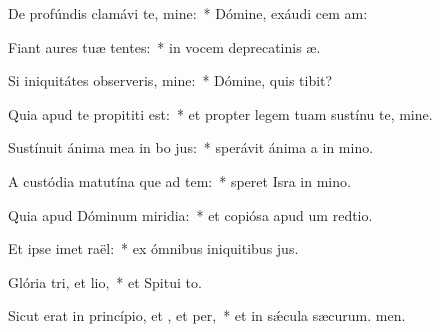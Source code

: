 \item De profúndis clamávi  te, mine:~* Dómine, exáudi cem am:
\item Fiant aures tuæ tentes:~* in vocem deprecatinis æ.
\item Si iniquitátes observeris, mine:~* Dómine, quis tibit?
\item Quia apud te propititi est:~* et propter legem tuam sustínu te, mine.
\item Sustínuit ánima mea in bo jus:~* sperávit ánima a in mino.
\item A custódia matutína que ad tem:~* speret Isra in mino.
\item Quia apud Dóminum miridia:~* et copiósa apud um redtio.
\item Et ipse imet raël:~* ex ómnibus iniquitibus jus.
\item Glória tri, et lio,~* et Spitui to.
\item Sicut erat in princípio, et , et per,~* et in sǽcula sæcurum. men.
